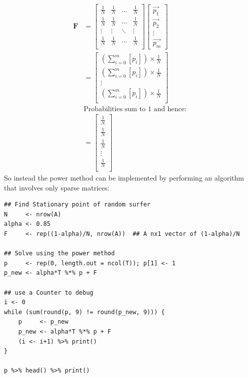 \documentclass[11pt]{article}
\begin{document}
\begin{align}
\mathbf{F} &=
\begin{bmatrix}
\frac{1}{N} & \frac{1}{N} & \ldots & \frac{1}{N} \\
\frac{1}{N} & \frac{1}{N} & \ldots & \frac{1}{N} \\
\vdots      & \vdots      & \ddots & \vdots \\
\frac{1}{N} & \frac{1}{N} & \ldots & \frac{1}{N} \\
\end{bmatrix} \label{eq:bgVal2}
\begin{bmatrix}
\vec{p_1} \\ \vec{p_2} \\ \vdots \\ \vec{p_m}
\end{bmatrix}  \\
&= \begin{bmatrix}
\left( \sum^{m}_{i= 0}   \left[ p_i \right]  \right) \times \frac{1}{N} \\
\left( \sum^{m}_{i= 0}   \left[ p_i \right]  \right) \times \frac{1}{N} \\
\vdots  \\
\left( \sum^{m}_{i= 0}   \left[ p_i \right]  \right) \times \frac{1}{N} \\
\end{bmatrix}  \\
& \text{Probabilities sum to 1 and hence:} \\
&= \begin{bmatrix}
\frac{1}{N} \\
\frac{1}{N} \\
\frac{1}{N} \\
\vdots  \\
\frac{1}{N} \\
\end{bmatrix}
\end{align}
So instead the power method can be implemented by performing an algorithm that involves only sparse matrices:

\lstset{language=r,label= ,caption= ,captionpos=b,numbers=none}
\begin{lstlisting}
## Find Stationary point of random surfer
N     <- nrow(A)
alpha <- 0.85
F     <- rep((1-alpha)/N, nrow(A))  ## A nx1 vector of (1-alpha)/N

## Solve using the power method
p     <- rep(0, length.out = ncol(T)); p[1] <- 1
p_new <- alpha*T %*% p + F

## use a Counter to debug
i <- 0
while (sum(round(p, 9) != round(p_new, 9))) {
    p     <- p_new
    p_new <- alpha*T %*% p + F
    (i <- i+1) %>% print()
}

p %>% head() %>% print()
\end{lstlisting}
\end{document}
